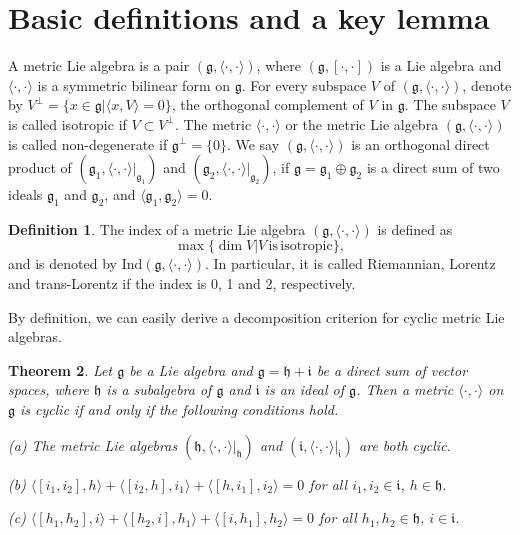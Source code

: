 \documentclass[reqno]{amsart}
\newtheorem{thm}{Theorem}[section]
\theoremstyle{definition}
\newtheorem{defn}[thm]{Definition}
\begin{document}
\section{Basic definitions and a key lemma}\label{sec2}
A metric Lie algebra is a pair $(\mathfrak{g},\langle\cdot,\cdot\rangle)$, where  $(\mathfrak{g},[\cdot,\cdot])$ is a Lie algebra and  $\langle\cdot,\cdot\rangle$ is a symmetric  bilinear  form on $\mathfrak{g}$. For every  subspace $V$ of  $(\mathfrak{g}, \langle\cdot,\cdot\rangle)$, denote by $V^{\perp}=\{x\in \mathfrak{g}|\langle x,V\rangle=0\}$, the orthogonal complement of $V$ in $\mathfrak{g}$. The subspace $V$ is called isotropic if $V\subset V^{\perp}$.
The metric $\langle\cdot,\cdot\rangle$ or the metric Lie algebra $(\mathfrak{g},\langle\cdot,\cdot\rangle)$  is called non-degenerate
if $\mathfrak{g}^{\perp}=\{0\}$.
We say $(\mathfrak{g}, \langle\cdot,\cdot\rangle)$ is an orthogonal direct product of $(\mathfrak{g}_{1},\langle\cdot,\cdot\rangle|_{\mathfrak{g}_{1}})$ and
$(\mathfrak{g}_{2},\langle\cdot,\cdot\rangle|_{\mathfrak{g}_{2}})$, if $\mathfrak{g}=\mathfrak{g}_{1}\oplus\mathfrak{g}_{2}$ is a direct sum of two ideals $\mathfrak{g}_{1}$ and $\mathfrak{g}_{2}$,
and $\langle\mathfrak{g}_{1},\mathfrak{g}_{2}\rangle=0$.
\begin{defn}
The index of a metric Lie algebra  $(\mathfrak{g},\langle\cdot,\cdot\rangle)$ is defined as
$$\max\{\dim V|V\,\mathrm{is}\, \mathrm{isotropic}\},$$
and is  denoted by $\mathrm{Ind}(\mathfrak{g},\langle\cdot,\cdot\rangle)$.
In particular, it is called Riemannian, Lorentz and trans-Lorentz if the index is 0,  1 and 2, respectively.
\end{defn}


By definition, we can easily derive a decomposition criterion for cyclic metric Lie algebras.
\begin{thm}\label{2-thm-abc}
Let $\mathfrak{g}$ be a  Lie algebra and  $\mathfrak{g}=\mathfrak{h}+\mathfrak{i}$ be a direct sum of  vector spaces,  where $\mathfrak{h}$ is a subalgebra of $\mathfrak{g}$ and $\mathfrak{i}$ is an ideal of $\mathfrak{g}$. Then a metric $\langle\cdot,\cdot\rangle$ on $\mathfrak{g}$ is cyclic if and only if the following conditions hold.

(a) The metric Lie algebras $(\mathfrak{h},\langle\cdot,\cdot\rangle|_{\mathfrak{h}})$ and  $(\mathfrak{i},\langle\cdot,\cdot\rangle|_{\mathfrak{i}})$ are both cyclic.

(b) $\langle[i_{1},i_{2}],h\rangle+\langle[i_{2},h],i_{1}\rangle+\langle[h,i_{1}],i_{2}\rangle=0$
for all $i_{1},i_{2}\in \mathfrak{i}$, $h\in \mathfrak{h}$.

(c) $\langle[h_{1},h_{2}],i\rangle+\langle[h_{2},i],h_{1}\rangle+\langle[i,h_{1}],h_{2}\rangle=0$
for all $h_{1},h_{2}\in \mathfrak{h}$, $i\in \mathfrak{i}$.
\end{thm}
\end{document}
